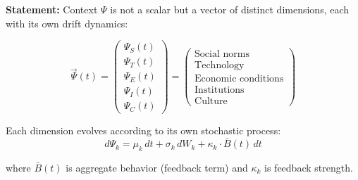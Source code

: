 \documentclass[11pt, a4paper]{article}
\begin{document}
\begin{tcolorbox}[colback=orange!5!white, colframe=orange!75!black,
    title=\textbf{Definition NTM-D2: Multi-Dimensional Context Vector}]

\textbf{Statement:} Context $\Psi$ is not a scalar but a vector of distinct dimensions, each with its own drift dynamics:

\begin{equation}
\vec{\Psi}(t) = \begin{pmatrix} \Psi_{S}(t) \\ \Psi_{T}(t) \\ \Psi_{E}(t) \\ \Psi_{I}(t) \\ \Psi_{C}(t) \end{pmatrix} = \begin{pmatrix} \text{Social norms} \\ \text{Technology} \\ \text{Economic conditions} \\ \text{Institutions} \\ \text{Culture} \end{pmatrix}
\label{eq:psi-vector}
\end{equation}

Each dimension evolves according to its own stochastic process:
\begin{equation}
d\Psi_k = \mu_k \, dt + \sigma_k \, dW_k + \kappa_k \cdot \bar{B}(t) \, dt
\end{equation}

where $\bar{B}(t)$ is aggregate behavior (feedback term) and $\kappa_k$ is feedback strength.

\end{tcolorbox}
\end{document}

